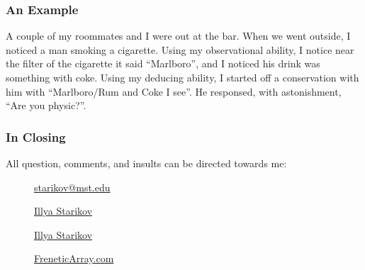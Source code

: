 \documentclass[xclolor=dvipsnames]{beamer}            %
\begin{document}
\begin{darkframes}
    \begin{frame}
        \frametitle{An Example}

        A couple of my roommates and I were out at the bar. When we went outside, I noticed a man smoking a cigarette. Using my observational ability, I notice near the filter of the cigarette it said ``Marlboro'', and I noticed his drink was something with coke. Using my deducing ability, I started off a conservation with him with ``Marlboro/Rum and Coke I see''. He responsed, with astonishment, ``Are you physic?''.

    \end{frame}

    \begin{frame}
        \frametitle{In Closing}

        All question, comments, and insults can be directed towards me:

        \begin{center}
            \begin{description}
                \item[\faComment] \href{mailto:starikov@mst.edu}{starikov@mst.edu}
                \item[\faLinkedin] \href{https://www.linkedin.com/in/illyastarikov/}{Illya Starikov}
                \item[\faGithub] \href{https://github.com/IllyaStarikov/}{Illya Starikov}
                \item[\faRss] \href{https://freneticarray.com/}{FreneticArray.com}
            \end{description}
        \end{center}

    \end{frame}
\end{darkframes}
\end{document}
